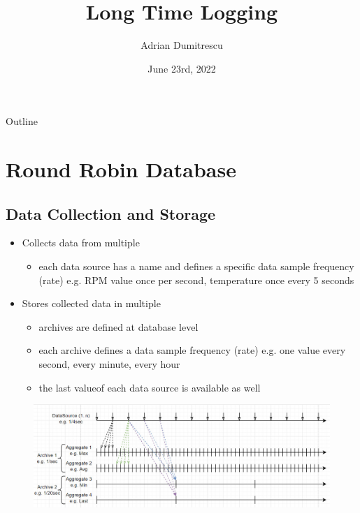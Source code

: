 \documentclass[t, 9pt, aspectratio=169]{beamer}
\title{Long Time Logging}
\subtitle{}
\author{Adrian Dumitrescu}
\institute{ThermoFisher Scientific}
\date{June 23rd, 2022}
\begin{document}
    \begin{frame}
        \titlepage
    \end{frame}

    \begin{frame}{Outline}
        \begin{multicols}{2}
            \tableofcontents
        \end{multicols}
    \end{frame}

    \section{Round Robin Database}
    \subsection{Data Collection and Storage}

    \begin{frame}{\secname}{\subsecname}
        \begin{itemize}
            \item Collects data from multiple 
            \begin{itemize}
                \item each data source has a name and defines a specific data sample frequency (rate) e.g. RPM value once per second, temperature once every 5 seconds
            \end{itemize}
            \item Stores collected data in multiple 
            \begin{itemize}
                \item archives are defined at database level
                \item each archive defines a data sample frequency (rate) e.g. one value every second, every minute, every hour
                \item the last value\footnotemark of each data source is available as well
            \end{itemize}
        \end{itemize}
        \begin{figure}
            \includegraphics[scale=0.35]{rrdb-structure.jpg}
        \end{figure}
    \end{frame}
\end{document}
